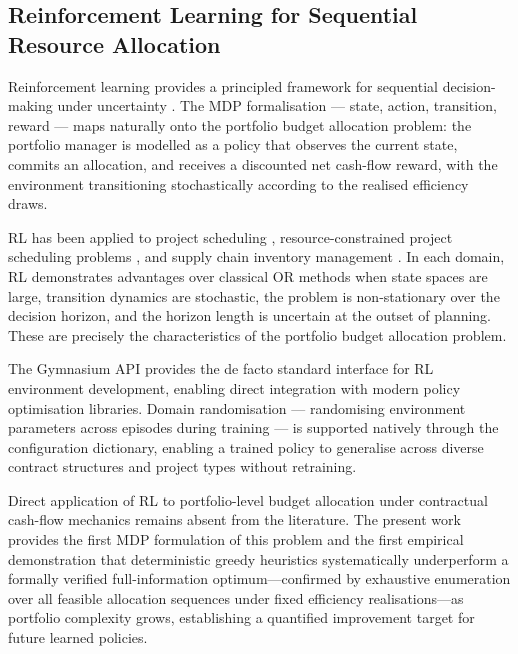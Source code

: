 \subsection{Reinforcement Learning for Sequential Resource Allocation}
\label{subsec:lr_rl}

Reinforcement learning provides a principled framework for sequential
decision-making under uncertainty \citep{Sutton2018}. The MDP
formalisation --- state, action, transition, reward --- maps naturally
onto the portfolio budget allocation problem: the portfolio manager is
modelled as a policy that observes the current state, commits an
allocation, and receives a discounted net cash-flow reward, with the
environment transitioning stochastically according to the realised
efficiency draws.

RL has been applied to project scheduling \citep{Peng2021, Liu2023},
resource-constrained project scheduling problems
\citep{Tassel2023}, and supply chain inventory management
\citep{Giannoccaro2002}. In each domain, RL demonstrates advantages
over classical OR methods when state spaces are large, transition
dynamics are stochastic, the problem is non-stationary over the
decision horizon, and the horizon length is uncertain at the outset
of planning. These are precisely the characteristics of the portfolio
budget allocation problem.

The Gymnasium API \citep{Towers2024} provides the de facto standard
interface for RL environment development, enabling direct integration
with modern policy optimisation libraries. Domain randomisation
\citep{Tobin2017} --- randomising environment parameters across
episodes during training --- is supported natively through the
configuration dictionary, enabling a trained policy to generalise
across diverse contract structures and project types without
retraining.

Direct application of RL to portfolio-level budget allocation under
contractual cash-flow mechanics remains absent from the literature.
The present work provides the first MDP formulation of this problem
and the first empirical demonstration that deterministic greedy
heuristics systematically underperform a formally verified
full-information optimum---confirmed by exhaustive enumeration over all
feasible allocation sequences under fixed efficiency realisations---as
portfolio complexity grows, establishing a quantified improvement
target for future learned policies.


